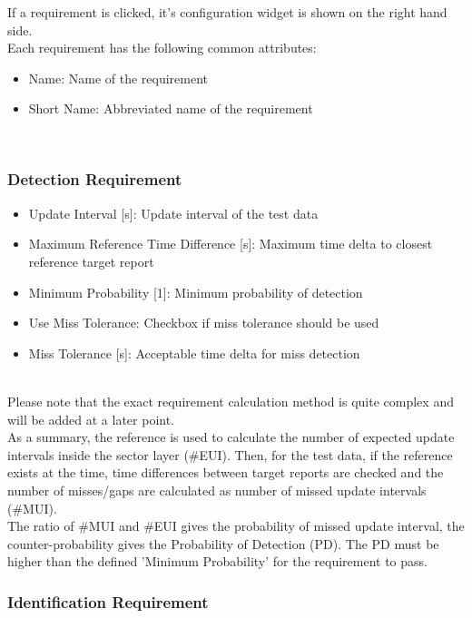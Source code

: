 If a requirement is clicked, it's configuration widget is shown on the right hand side. \\

Each requirement has the following common attributes:
\begin{itemize}  
\item Name: Name of the requirement
\item Short Name: Abbreviated name of the requirement
\end{itemize}
\ \\

\subsubsection{Detection Requirement}

\begin{itemize}  
\item Update Interval [s]: Update interval of the test data
\item Maximum Reference Time Difference [s]: Maximum time delta to closest reference target report
\item Minimum Probability [1]: Minimum probability of detection
\item Use Miss Tolerance: Checkbox if miss tolerance should be used
\item Miss Tolerance [s]: Acceptable time delta for miss detection
\end{itemize}
\ \\

Please note that the exact requirement calculation method is quite complex and will be added at a later point. \\

As a summary, the reference is used to calculate the number of expected update intervals inside the sector layer (\#EUI). Then, for the test data, if the reference exists at the time, time differences between target reports are checked and the number of misses/gaps are calculated as number of missed update intervals (\#MUI). \\

The ratio of \#MUI and \#EUI gives the probability of missed update interval, the counter-probability gives the Probability of Detection (PD). The PD must be higher than the defined 'Minimum Probability' for the requirement to pass.

\subsubsection{Identification Requirement}

